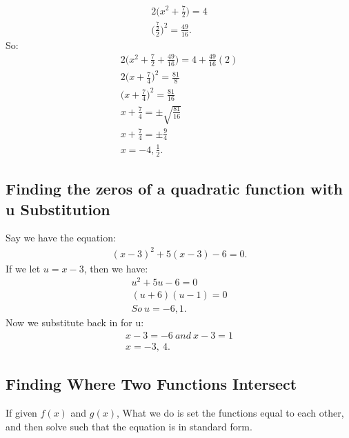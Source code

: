 \documentclass{report}
\begin{document}
\begin{itemize}
\begin{align*}
            2\bigg(x^{2}+\frac{7}{2}\bigg) = 4 \\
            \bigg(\frac{\frac{7}{2}}{2}\bigg)^{2} = \frac{49}{16}
          .\end{align*}
          \bigbreak \noindent 
          So:
          \begin{align*}
            2\bigg(x^{2}+\frac{7}{2} + \frac{49}{16}\bigg) = 4 + \frac{49}{16}(2) \\
            2\bigg(x+\frac{7}{4}\bigg)^{2} = \frac{81}{8} \\
            \bigg(x+\frac{7}{4}\bigg)^{2} = \frac{81}{16}  \\
            x + \frac{7}{4} = \pm \sqrt{\frac{81}{16}} \\
            x + \frac{7}{4} = \pm \frac{9}{4} \\
            \boxed{x = -4, \frac{1}{2}}
          .\end{align*}
          \bigbreak \noindent 
          \bigbreak \noindent 

          \end{itemize}
          \bigbreak \noindent 

    \bigbreak \noindent \bigbreak \noindent 
    \subsection{Finding the zeros of a quadratic function with u Substitution}
    Say we have the equation:
    \begin{align*}
      (x-3)^{2}+5(x-3)-6 = 0
    .\end{align*}
    \bigbreak \noindent 
    If we let $u=x-3$, then we have:
    \begin{align*}
      u^{2} +5u -6 = 0 \\
       (u+6)(u-1) = 0 \\
       So\ u=-6,1
    .\end{align*}
    Now we substitute back in for u:
    \begin{align*}
      x-3 = -6\ and\ x-3 = 1 \\
      x = -3,\ 4
    .\end{align*}

    \bigbreak \noindent \bigbreak \noindent
    \subsection{Finding Where Two Functions Intersect}
    If given $f(x)$ and $g(x)$, What we do is set the functions equal to each other, and then solve such that
    the equation is in standard form.
\end{document}
